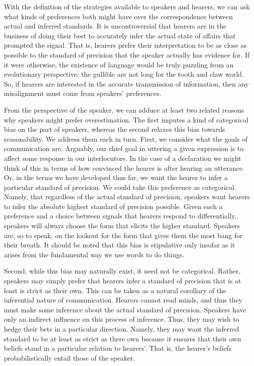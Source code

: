 \documentclass[12pt]{article}
\theoremstyle{definition} \newtheorem{definition}{Definition}
\begin{document}
With the definition of the strategies available to speakers and hearers, we can ask what kinds of preferences both might have over the correspondence between actual and inferred standards. It is uncontroversial that hearers are in the business of doing their best to accurately infer the actual state of affairs that prompted the signal. That is, hearers prefer their interpretation to be as close as possible to the standard of precision that the speaker actually has evidence for.  If it were otherwise, the existence of language would be truly puzzling from an evolutionary perspective; the gullible are not long for the tooth and claw world. So, if hearers are interested in the accurate transmission of information, then any misalignment must come from speakers' preferences. 

From the perspective of the speaker, we can adduce at least two related reasons why speakers might prefer overestimation. The first imputes a kind of categorical bias on the part of speakers, whereas the second relaxes this bias towards reasonability. We address them each in turn. First, we consider what the goals of communication are. Arguably, our chief goal in uttering a given expression is to affect some response in our interlocutors. In the case of a declaration we might think of this in terms of how convinced the hearer is after hearing an utterance. Or, in the terms we have developed thus far, we want the hearer to infer a particular standard of precision. We could take this preference as categorical. Namely, that regardless of the actual standard of precision, speakers want hearers to infer the absolute highest standard of precision possible. Given such a preference and a choice between signals that hearers respond to differentially, speakers will always choose the form that elicits the higher 
standard.  Speakers are, so to speak, on the lookout for the form that gives them the most bang for their breath. It should be noted that this bias is stipulative only insofar as it arises from the fundamental way we use words to do things.

Second, while this bias may naturally exist, it need not be categorical. Rather, speakers may simply prefer that hearers infer a standard of precision that is at least is strict as their own. This can be taken as a natural corollary of the inferential nature of communication. Hearers cannot read minds, and thus they must make some inference about the actual standard of precision. Speakers have only an indirect influence on this process of inference. Thus, they may wish to hedge their bets in a particular direction. Namely, they may want the inferred standard to be at least as strict as there own because it ensures that their own beliefs stand in a particular relation to hearers'. That is, the hearer's beliefs probabilistically entail those of the speaker.
\end{document}
